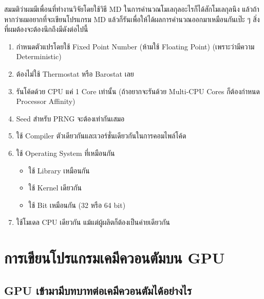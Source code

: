 สมมติว่าผมมีเพื่อนที่ทำงานวิจัยโดยใช้วิธี MD ในการคำนวณโมเลกุลอะไรก็ได้สักโมเลกุลนึง แล้วถ้าหากว่าผมอยากที่จะเขียนโปรแกรม MD แล้วก็รันเพื่อให้ได้ผลการคำนวณออกมาเหมือนกันเป๊ะ ๆ สิ่งที่ผมต้องจะต้องนึกถึงมีดังต่อไปนี้
%
\begin{enumerate}[topsep=0pt,noitemsep]
  \setlength\itemsep{0.5em}
  \item กำหนดตัวแปรโดยใช้ Fixed Point Number (ห้ามใช้ Floating Point) (เพราะว่ามีความ Deterministic)

  \item ต้องไม่ใช้ Thermostat หรือ Barostat เลย

  \item รันโค้ดด้วย CPU แค่ 1 Core เท่านั้น (ถ้าอยากจะรันด้วย Multi-CPU Cores ก็ต้องกำหนด Processor Affinity)

  \item Seed สำหรับ PRNG จะต้องเท่ากันเสมอ

  \item ใช้ Compiler ตัวเดียวกันและเวอร์ชั่นเดียวกันในการคอมไพล์โค้ด

  \item ใช้ Operating System ที่เหมือนกัน
        \begin{itemize}[topsep=0pt,noitemsep]
          \setlength\itemsep{0.5em}
          \item ใช้ Library เหมือนกัน

          \item ใช้ Kernel เดียวกัน

          \item ใช้ Bit เหมือนกัน (32 หรือ 64 bit)
        \end{itemize}

  \item ใช้โมเดล CPU เดียวกัน แม้แต่ผู้ผลิตก็ต้องเป็นค่ายเดียวกัน
\end{enumerate}

\section{การเขียนโปรแกรมเคมีควอนตัมบน GPU}

\subsection{GPU เข้ามามีบทบาทต่อเคมีควอนตัมได้อย่างไร}

